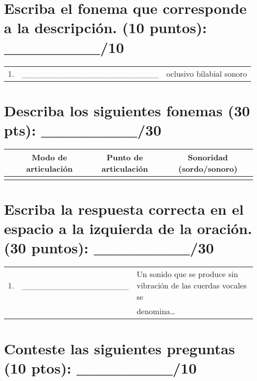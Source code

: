 \documentclass[12pt]{exam}
\begin{document}
\vspace{0.1in}

\section{Escriba el fonema que corresponde a la descripción. (10 puntos): \_\_\_\_\_\_\_\_/10}
\renewcommand{\arraystretch}{1.75}
	\begin{tabular}{@{}lll@{}}
	1.  & \_\_\_\_\_\_\_\_\_\_\_\_\_\_\_\_\_\_\_\_\_\_\_ & oclusivo bilabial sonoro    \\
	\end{tabular}

\vspace{.2in}

\section{Describa los siguientes fonemas (30 pts): \_\_\_\_\_\_\_\_/30}

	\begin{center}
		\begin{tabular}{|c|c|c|c|}
			\hline
			    & Modo de articulación & Punto de articulación & Sonoridad (sordo/sonoro)\\
			\hline
			\textipa{/g/} & & & \\
			\hline
		\end{tabular}
	\end{center}

\vspace{.2in}

\section{Escriba la respuesta correcta en el espacio a la izquierda de la oración. (30 puntos): \_\_\_\_\_\_\_\_/30}

\renewcommand{\arraystretch}{1.75}
	\begin{tabular}{@{}llp{2cm}@{}}
	 1.  & \_\_\_\_\_\_\_\_\_\_\_\_\_\_\_\_\_\_ & Un sonido que se produce sin vibración de las cuerdas vocales se \\&& denomina\ldots        \\
	\end{tabular}

\vspace{.2in}

\section{Conteste las siguientes preguntas (10 ptos): \_\_\_\_\_\_\_\_/10}
\end{document}
